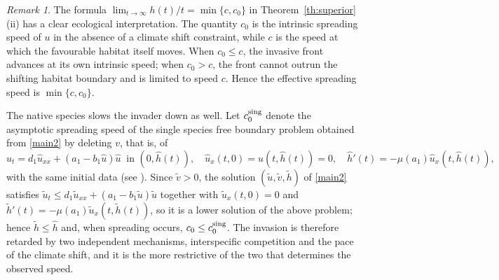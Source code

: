 \documentclass[reqno]{amsart}
\newcommand{\rev}[1]{#1}
\theoremstyle{plain}
\theoremstyle{definition}
\theoremstyle{remark}
\newtheorem{remark}{Remark}
\begin{document}
	\begin{remark}\rev{\label{rm:speed}}
		The formula $\lim_{t\to\infty} h(t)/t = \min\{c,c_0\}$ in Theorem~\ref{th:superior}(ii) has a clear ecological interpretation. The quantity $c_0$ is the intrinsic spreading speed of $u$ in the absence of a climate shift constraint, while $c$ is the speed at which the favourable habitat itself moves. When $c_0 \le c$, the invasive front advances at its own intrinsic speed; when $c_0 > c$, the front cannot outrun the shifting habitat boundary and is limited to speed $c$. Hence the effective spreading speed is $\min\{c, c_0\}$.

		\rev{The native species slows the invader down as well. Let $c_0^{\rm sing}$
		denote the asymptotic spreading speed of the single species free boundary
		problem obtained from \eqref{main2} by deleting $v$, that is, of
		\[
		\hat u_t=d_1\hat u_{xx}+(a_1-b_1\hat u)\hat u \ \text{ in } (0,\hat h(t)),\quad
		\hat u_x(t,0)=\hat u(t,\hat h(t))=0,\quad \hat h'(t)=-\mu(a_1)\hat u_x(t,\hat h(t)),
		\]
		with the same initial data (see \cite{MR2607347,MR4404216}). Since
		$\tilde v>0$, the solution $(\tilde u,\tilde v,\tilde h)$ of \eqref{main2}
		satisfies
		$\tilde u_t\le d_1\tilde u_{xx}+(a_1-b_1\tilde u)\tilde u$ together with
		$\tilde u_x(t,0)=0$ and
		$\tilde h'(t)=-\mu(a_1)\tilde u_x(t,\tilde h(t))$, so it is a lower solution
		of the above problem; hence $\tilde h\le\hat h$ and, when spreading occurs,
		$c_0\le c_0^{\rm sing}$. The invasion is therefore retarded by two
		independent mechanisms, interspecific competition and the pace of the
		climate shift, and it is the more restrictive of the two that determines
		the observed speed.}
	\end{remark}
	
\end{document}
